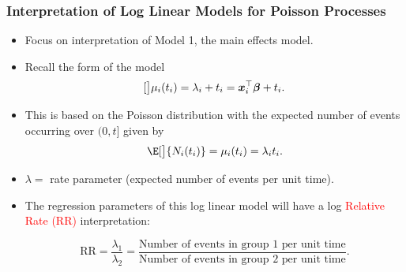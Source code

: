 \documentclass[oneside]{book}\usepackage[]{graphicx}\usepackage[svgnames]{xcolor}
\let\log\relax%
\newcommand{\RR}{\text{RR}}%
\providecommand{\Vector}[1]{\bm{#1}}%
\begin{document}
\subsubsection*{Interpretation of Log Linear Models for Poisson Processes}
\begin{itemize}
      \item Focus on interpretation of Model 1, the main effects model.
      \item Recall the form of the model
            \[ \log[\big]{\mu_i(t_i)}=\log{\lambda_i}+\log{t_i}=\Vector{x}_i^\top \Vector{\beta}+\log{t_i}. \]
      \item This is based on the Poisson distribution with the expected number of events
            occurring over $ (0,t] $ given by
            \[ \E[\big]{N_i(t_i)}=\mu_i(t_i)=\lambda_i t_i. \]
      \item $ \lambda= $ rate parameter (expected number of events per unit time).
      \item The regression parameters of this log linear model will have a log \textcolor{Red}{Relative Rate (RR)} interpretation:
            \begin{Regular}{}
                  \[ \RR = \frac{\lambda_1}{\lambda_2}=\frac{\text{Number of events in group 1 per unit time}}{\text{Number of events in group 2 per unit time}}. \]
            \end{Regular}
\end{itemize}
\end{document}
